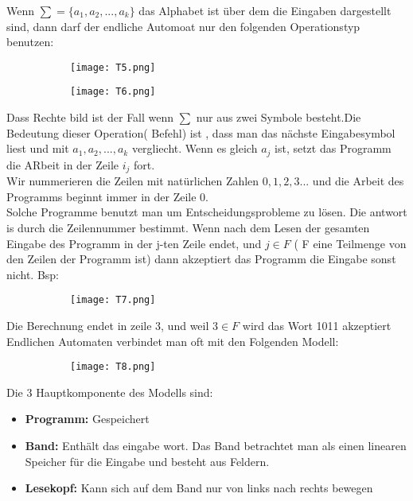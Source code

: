 \documentclass[8pt]{extreport}
\begin{document}
Wenn $\sum = \{a_1,a_2,...,a_k\}$ das Alphabet ist über dem die Eingaben dargestellt sind, dann darf der endliche Automoat nur den folgenden Operationstyp benutzen:
\begin{figure}[H]
\centering
\begin{subfigure}[b]{0.3\linewidth}
\texttt{[image: T5.png]}
\end{subfigure}
\begin{subfigure}[b]{0.3\linewidth}
\texttt{[image: T6.png]}
\end{subfigure}
\end{figure}
Dass Rechte bild ist der Fall wenn $\sum$ nur aus zwei Symbole besteht.Die Bedeutung dieser Operation( Befehl) ist , dass man das nächste Eingabesymbol liest und mit $a_1,a_2,...,a_k$ vergliecht. Wenn es gleich $a_j$ ist, setzt das Programm die ARbeit in der Zeile $i_j$ fort.\\
Wir nummerieren die Zeilen mit natürlichen Zahlen $0,1,2,3...$ und die Arbeit des Programms beginnt immer in der Zeile 0.\\
Solche Programme benutzt man um Entscheidungsprobleme zu lösen. Die antwort is durch die Zeilennummer bestimmt. Wenn nach dem Lesen der gesamten Eingabe des Programm in der j-ten Zeile endet, und $j \in F $ ( F eine Teilmenge von den Zeilen der Programm ist) dann akzeptiert das Programm die Eingabe sonst nicht. Bsp:
\begin{figure}[H]
\centering
\begin{subfigure}[b]{0.6\linewidth}
\texttt{[image: T7.png]}
\end{subfigure}
\end{figure}
Die Berechnung endet in zeile 3, und weil $3 \in F$ wird das Wort 1011 akzeptiert\\

Endlichen Automaten verbindet man oft mit den Folgenden Modell:
\begin{figure}[H]
\centering
\begin{subfigure}[b]{0.4\linewidth}
\texttt{[image: T8.png]}
\end{subfigure}
\end{figure}
Die 3 Hauptkomponente des Modells sind:
\begin{itemize}
\item \textbf{Programm:} Gespeichert
\item \textbf{Band:} Enthält das eingabe wort. Das Band betrachtet man als einen linearen Speicher für die Eingabe und besteht aus Feldern.
\item \textbf{Lesekopf:} Kann sich auf dem Band nur von links nach rechts bewegen
\end{itemize}
\end{document}
